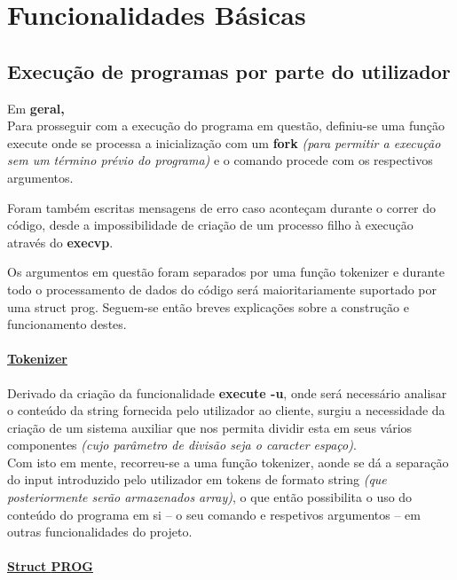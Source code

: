 \documentclass[11.5pt,a4paper]{report}
\begin{document}
\newpage
\chapter{Funcionalidades Básicas}
\section{Execução de programas por parte do utilizador}

Em \textbf{geral,}\\

Para prosseguir com a execução do programa em questão, definiu-se uma função execute onde se processa a inicialização com um \textbf{fork} \textit{(para permitir a execução sem um término prévio do programa)} e o comando procede com os respectivos argumentos.\par
Foram também escritas mensagens de erro caso aconteçam durante o correr do código, desde a impossibilidade de criação de um processo filho à execução através do \textbf{execvp}.\par
Os argumentos em questão foram separados por uma função tokenizer e durante todo o processamento de dados do código será maioritariamente suportado por uma struct prog. Seguem-se então breves explicações sobre a construção e funcionamento destes.

\subsubsection{\underline{Tokenizer}}

Derivado da criação da funcionalidade \textbf{execute -u}, onde será necessário analisar o conteúdo da string fornecida pelo utilizador ao cliente, surgiu a necessidade da criação de um sistema auxiliar que nos permita dividir esta em seus vários componentes \textit{(cujo parâmetro de divisão seja o caracter espaço)}.\\
Com isto em mente, recorreu-se a uma função tokenizer, aonde se dá a separação do input introduzido pelo utilizador em tokens de formato string \textit{(que posteriormente serão armazenados array)}, o que então possibilita o uso do conteúdo do programa em si – o seu comando e respetivos argumentos – em outras funcionalidades do projeto.

\subsubsection{\underline{Struct \textbf{PROG}}}
\end{document}
